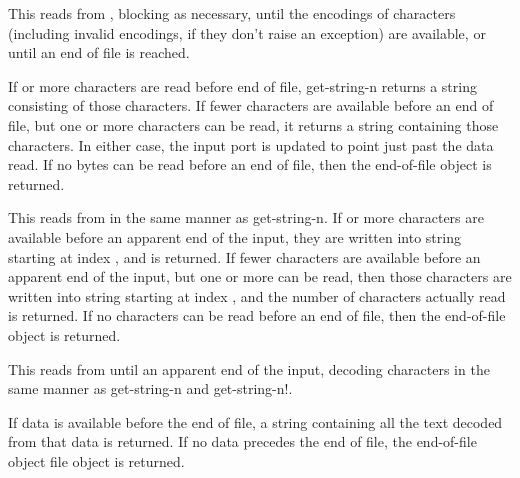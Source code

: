 \begin{entry}{%
}
   
This reads from , blocking as necessary, until the
encodings of  characters (including invalid encodings, if they
don't raise an exception) are available, or until an end of
file is reached.
   
If  or more characters are read before end of file, {\cf
  get-string-n} returns a string consisting of those 
characters. If fewer characters are available before an end of file,
but one or more characters can be read, it returns a string containing
those characters. In either case, the input port is updated to point
just past the data read. If no bytes can be read before an 
end of file, then the end-of-file object is returned.
\end{entry}

\begin{entry}{%
}


This reads from  in the same manner as {\cf
  get-string-n}.  If  or more characters are available
before an apparent end of the input, they are written into string
starting at index , and  is returned. If fewer
characters are available before an apparent end of the input, but one
or more can be read, then those characters are written into string
starting at index , and the number of characters actually read is
returned. If no characters can be read before an end of file,
then the end-of-file object is returned.
\end{entry}   

\begin{entry}{%
}
   
This reads from  until an apparent end of the input, decoding
characters in the same manner as {\cf get-string-n} and {\cf get-string-n!}.
   
If data is available before the end of file, a string
containing all the text decoded from that data is returned. If no data
precedes the end of file, the end-of-file object file object is
returned.
\end{entry}

